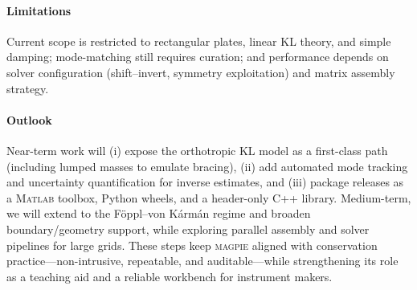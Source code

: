 \paragraph{Limitations}
Current scope is restricted to rectangular plates, linear KL theory, and simple damping; mode-matching still requires curation; and performance depends on solver configuration (shift–invert, symmetry exploitation) and matrix assembly strategy.

\paragraph{Outlook}
Near-term work will (i) expose the orthotropic KL model as a first-class path (including lumped masses to emulate bracing), (ii) add automated mode tracking and uncertainty quantification for inverse estimates, and (iii) package releases as a M\textsc{atlab} toolbox, Python wheels, and a header-only C\textsc{++} library. Medium-term, we will extend to the Föppl–von Kármán regime and broaden boundary/geometry support, while exploring parallel assembly and solver pipelines for large grids. These steps keep \textsc{magpie} aligned with conservation practice—non-intrusive, repeatable, and auditable—while strengthening its role as a teaching aid and a reliable workbench for instrument makers.
